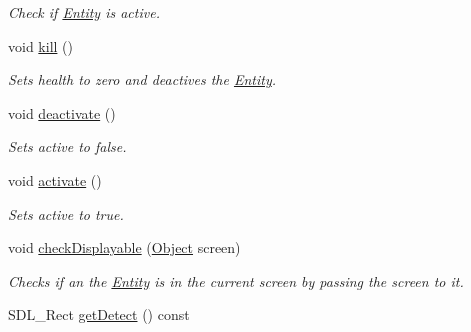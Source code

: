\begin{DoxyCompactItemize}
\begin{DoxyCompactList}\small\item\em Check if \hyperlink{classEntity}{Entity} is active. \end{DoxyCompactList}\item 
void \hyperlink{classEntity_a522648b330daab91b49f78f0737a943f}{kill} ()\hypertarget{classEntity_a522648b330daab91b49f78f0737a943f}{}\label{classEntity_a522648b330daab91b49f78f0737a943f}

\begin{DoxyCompactList}\small\item\em Sets health to zero and deactives the \hyperlink{classEntity}{Entity}. \end{DoxyCompactList}\item 
void \hyperlink{classEntity_aa409e70e0f5abb2ac1314f8745b9a661}{deactivate} ()\hypertarget{classEntity_aa409e70e0f5abb2ac1314f8745b9a661}{}\label{classEntity_aa409e70e0f5abb2ac1314f8745b9a661}

\begin{DoxyCompactList}\small\item\em Sets active to false. \end{DoxyCompactList}\item 
void \hyperlink{classEntity_a95079be1c9fa9f109dd3cf7446eeeb1d}{activate} ()\hypertarget{classEntity_a95079be1c9fa9f109dd3cf7446eeeb1d}{}\label{classEntity_a95079be1c9fa9f109dd3cf7446eeeb1d}

\begin{DoxyCompactList}\small\item\em Sets active to true. \end{DoxyCompactList}\item 
void \hyperlink{classEntity_a63aac9638f79f0608b08f28b8cdc718e}{check\+Displayable} (\hyperlink{classObject}{Object} screen)\hypertarget{classEntity_a63aac9638f79f0608b08f28b8cdc718e}{}\label{classEntity_a63aac9638f79f0608b08f28b8cdc718e}

\begin{DoxyCompactList}\small\item\em Checks if an the \hyperlink{classEntity}{Entity} is in the current screen by passing the screen to it. \end{DoxyCompactList}\item 
S\+D\+L\+\_\+\+Rect \hyperlink{classEntity_a62073e91ee6f63f4b9a7e1512cda2e46}{get\+Detect} () const \hypertarget{classEntity_a62073e91ee6f63f4b9a7e1512cda2e46}{}\label{classEntity_a62073e91ee6f63f4b9a7e1512cda2e46}


\end{DoxyCompactItemize}
